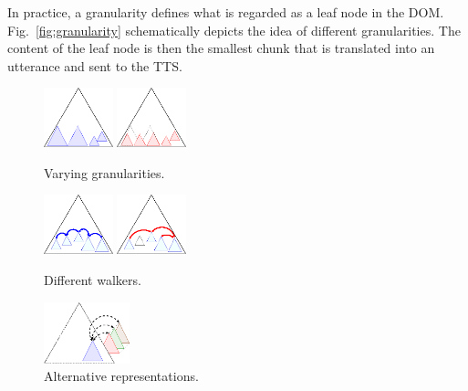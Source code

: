 \documentclass{sig-alternate}
\begin{document}
In practice, a granularity defines what is regarded as a leaf node in the
DOM. Fig.~\ref{fig:granularity} schematically depicts the idea of different
granularities. The content of the leaf node is then the smallest chunk that is
translated into an utterance and sent to the TTS.

\begin{figure}[t!]
  \begin{minipage}{.33\linewidth}
    \begin{center}
      \leavevmode
      \includegraphics[width=2cm]{images/granularity1}\qquad
      \includegraphics[width=2cm]{images/granularity2}
      \caption{Varying granularities.}
      \label{fig:granularity}
    \end{center}
  \end{minipage}
  \begin{minipage}{.33\linewidth}
  \begin{center}
    \leavevmode
    \includegraphics[width=2cm]{images/walker1}\qquad
    \includegraphics[width=2cm]{images/walker2}
    \caption{Different walkers.}
    \label{fig:walkers}
  \end{center}
\end{minipage}
  \begin{minipage}{.33\linewidth}
\begin{center}
    \leavevmode
    \includegraphics[width=2.5cm]{images/substructure1}
    \caption{Alternative representations.}
    \label{fig:alt}
  \end{center}
\end{minipage}
\end{figure}
\end{document}
